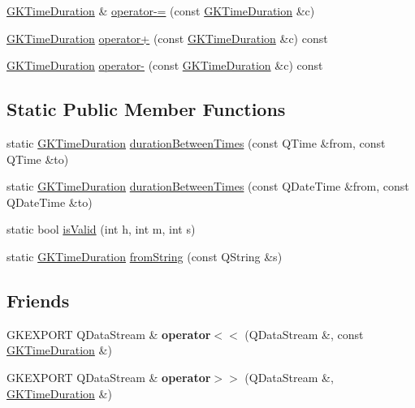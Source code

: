 \begin{DoxyCompactItemize}
\hyperlink{classGKTimeDuration}{G\+K\+Time\+Duration} \& \hyperlink{classGKTimeDuration_a15e9d7585b367bec684bbeb1f3433cc7}{operator-\/=} (const \hyperlink{classGKTimeDuration}{G\+K\+Time\+Duration} \&c)
\item 
\hyperlink{classGKTimeDuration}{G\+K\+Time\+Duration} \hyperlink{classGKTimeDuration_a207c33c362a3f225fafa257c5d2a2796}{operator+} (const \hyperlink{classGKTimeDuration}{G\+K\+Time\+Duration} \&c) const 
\item 
\hyperlink{classGKTimeDuration}{G\+K\+Time\+Duration} \hyperlink{classGKTimeDuration_af0c9b2d9432fa06f64d287ccb6f86976}{operator-\/} (const \hyperlink{classGKTimeDuration}{G\+K\+Time\+Duration} \&c) const 
\end{DoxyCompactItemize}
\subsection*{Static Public Member Functions}
\begin{DoxyCompactItemize}
\item 
static \hyperlink{classGKTimeDuration}{G\+K\+Time\+Duration} \hyperlink{classGKTimeDuration_a946f27b1c6067ebae9c350ba7a9caa4d}{duration\+Between\+Times} (const Q\+Time \&from, const Q\+Time \&to)
\item 
static \hyperlink{classGKTimeDuration}{G\+K\+Time\+Duration} \hyperlink{classGKTimeDuration_a20e724a6d56ef1a30247fa1c73f18e2f}{duration\+Between\+Times} (const Q\+Date\+Time \&from, const Q\+Date\+Time \&to)
\item 
static bool \hyperlink{classGKTimeDuration_ac464568ea70da6a938917513bd8f65ea}{is\+Valid} (int h, int m, int s)
\item 
static \hyperlink{classGKTimeDuration}{G\+K\+Time\+Duration} \hyperlink{classGKTimeDuration_af202d4742fd47b841f0976cb2b360c5b}{from\+String} (const Q\+String \&s)
\end{DoxyCompactItemize}
\subsection*{Friends}
\begin{DoxyCompactItemize}
\item 
G\+K\+E\+X\+P\+O\+RT Q\+Data\+Stream \& {\bfseries operator$<$$<$} (Q\+Data\+Stream \&, const \hyperlink{classGKTimeDuration}{G\+K\+Time\+Duration} \&)\hypertarget{classGKTimeDuration_a697ce2be9f789e134bbb0136998fe4b2}{}\label{classGKTimeDuration_a697ce2be9f789e134bbb0136998fe4b2}

\item 
G\+K\+E\+X\+P\+O\+RT Q\+Data\+Stream \& {\bfseries operator$>$$>$} (Q\+Data\+Stream \&, \hyperlink{classGKTimeDuration}{G\+K\+Time\+Duration} \&)\hypertarget{classGKTimeDuration_a59821b0943515d9e168a946492f5b4bc}{}\label{classGKTimeDuration_a59821b0943515d9e168a946492f5b4bc}

\end{DoxyCompactItemize}


